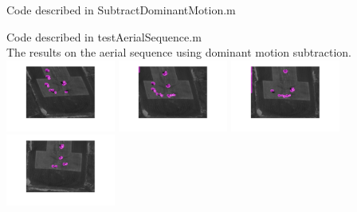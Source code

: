 \documentclass[12pt]{article}
\newenvironment{problem}[2][Problem]{\begin{trivlist}
\item[\hskip \labelsep {\bfseries #1}\hskip \labelsep {\bfseries #2.}]}{\end{trivlist}}
\begin{document}
\begin{problem}{3.2}
Code described in SubtractDominantMotion.m\\
\end{problem}


\begin{problem}{3.3}
Code described in testAerialSequence.m\\
The results on the aerial sequence using dominant motion subtraction.\\
  \includegraphics[width=0.27\textwidth]{results/30_ariel}
  \includegraphics[width=0.27\textwidth]{results/60_ariel}
  \includegraphics[width=0.27\textwidth]{results/90_ariel}
  \includegraphics[width=0.27\textwidth]{results/120_ariel}  
\end{problem}
\end{document}
